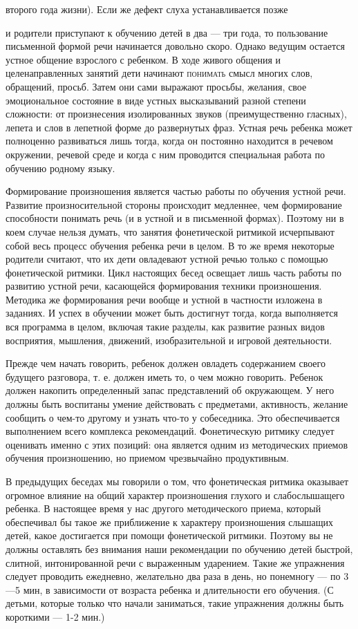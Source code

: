 \documentclass{book}
\begin{document}
второго года жизни). Если же дефект слуха устанавливается позже

и родители приступают к обучению детей в два --- три года, то
пользование письменной формой речи начинается довольно скоро. Однако
ведущим остается устное общение взрослого с ребенком. В ходе живого
общения и целенаправленных занятий дети начинают \textsc{понимать} смысл
многих слов, обращений, просьб. Затем они сами выражают просьбы,
желания, свое эмоциональное состояние в виде устных высказываний разной
степени сложности: от произнесения изолированных звуков (преимущественно
гласных), лепета и слов в лепетной форме до развернутых фраз. Устная
речь ребенка может полноценно развиваться лишь тогда, когда он постоянно
находится в речевом окружении, речевой среде и когда с ним проводится
специальная работа по обучению родному языку.

Формирование произношения является частью работы по обучения устной
речи. Развитие произносительной стороны происходит медленнее, чем
формирование способности понимать речь (и в устной и в письменной
формах). Поэтому ни в коем случае нельзя думать, что занятия
фонетической ритмикой исчерпывают собой весь процесс обучения ребенка
речи в целом. В то же время некоторые родители считают, что их дети
овладевают устной речью только с помощью фонетической ритмики. Цикл
настоящих бесед освещает лишь часть работы по развитию устной речи,
касающейся формирования техники произношения. Методика же формирования
речи вообще и устной в частности изложена в заданиях. И успех в обучении
может быть достигнут тогда, когда выполняется вся программа в целом,
включая такие разделы, как развитие разных видов восприятия, мышления,
движений, изобразительной и игровой деятельности.

Прежде чем начать говорить, ребенок должен овладеть содержанием своего
будущего разговора, т. е. должен иметь то, о чем можно говорить. Ребенок
должен накопить определенный запас представлений об окружающем. У него
должны быть воспитаны умение действовать с предметами, активность,
желание сообщить о чем-то другому и узнать что-то у собеседника. Это
обеспечивается выполнением всего комплекса рекомендаций. Фонетическую
ритмику следует оценивать именно с этих позиций: она является одним из
методических приемов обучения произношению, но приемом чрезвычайно
продуктивным.

В предыдущих беседах мы говорили о том, что фонетическая ритмика
оказывает огромное влияние на общий характер произношения глухого и
слабослышащего ребенка. В настоящее время у нас другого методического
приема, который обеспечивал бы такое же приближение к характеру
произношения слышащих детей, какое достигается при помощи фонетической
ритмики. Поэтому вы не должны оставлять без внимания наши рекомендации
по обучению детей быстрой, слитной, интонированной речи с выраженным
ударением. Такие же упражнения следует проводить ежедневно, желательно
два раза в день, но понемногу --- по 3---5 мин, в зависимости от
возраста ребенка и длительности его обучения. (С детьми, которые только
что начали заниматься, такие упражнения должны быть короткими --- 1-2
мин.)
\end{document}
